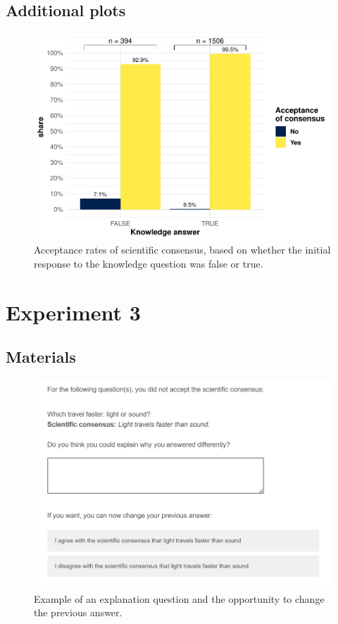 \documentclass[
  doc,floatsintext]{apa6}
\begin{document}
\subsection{Additional plots}\label{additional-plots-1}



\begin{figure}
\centering
\includegraphics{output/figures/exp2-conditional-acceptance.pdf}
\caption{\label{fig:exp2-conditional-acceptance}Acceptance rates of scientific consensus, based on whether the initial response to the knowledge question was false or true.}
\end{figure}




\clearpage

\section{Experiment 3}\label{exp3}

\subsection{Materials}\label{materials-5}

\FloatBarrier



\begin{figure}

{\centering \includegraphics[width=0.5\linewidth]{figures/study3_example_explanation} 

}

\caption{Example of an explanation question and the opportunity to change the previous answer.}\label{fig:exp3-explanation-example}
\end{figure}
\end{document}
